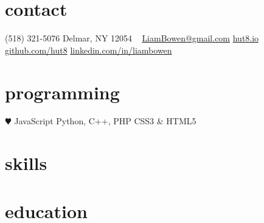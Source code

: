 \documentclass[]{friggeri-cv} %
\begin{document}


\begin{aside} %
\section{contact}
(518) 321-5076
Delmar, NY 12054
~
\href{mailto:LiamBowen@gmail.com}{LiamBowen@gmail.com}
\href{http://hut8.io}{hut8.io}
\href{https://github.com/hut8}{github.com/hut8}
\href{https://linkedin.com/in/liambowen}{linkedin.com/in/liambowen}
~
\section{programming}
{\color{red} $\varheartsuit$} JavaScript
Python, C++, PHP
CSS3 \& HTML5
\end{aside}


\section{skills}




\section{education}
\end{document}
